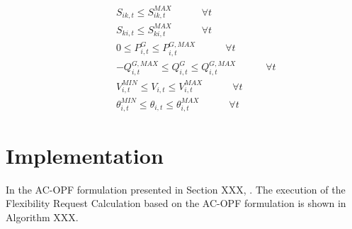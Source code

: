 \begin{subequations}
\begin{alignat}{2}
&                  &      &  S_{ik,t} \leq S_{ik,t}^{MAX}  \quad   \qquad  \forall t  \label{eq:Siklimit} \\
&                  &      &  S_{ki,t} \leq S_{ki,t}^{MAX}  \quad   \qquad  \forall t  \label{eq:Skilimit} \\ 
&                  &      &  0 \leq P_{i,t}^{G} \leq P_{i,t}^{G,MAX}  \quad   \qquad  \forall t  \label{eq:genactivepower} \\
&                  &      &  - Q_{i,t}^{G,MAX} \leq Q_{i,t}^{G} \leq Q_{i,t}^{G,MAX}  \quad   \qquad  \forall t \label{eq:genreactivepower} \\
&                  &      &  V_{i,t}^{MIN} \leq V_{i,t} \leq V_{i,t}^{MAX}  \quad   \qquad  \forall t \label{eq:voltagelimit} \\
&                  &      & \theta_{i,t}^{MIN} \leq \theta_{i,t}  \leq \theta_{i,t}^{MAX} \quad   \qquad  \forall t  \label{eq:voltageangle}
\end{alignat}
\end{subequations}

\section{Implementation}

In the AC-OPF formulation presented in Section XXX, . The execution of the Flexibility Request Calculation based on the AC-OPF formulation is shown in Algorithm XXX. 


